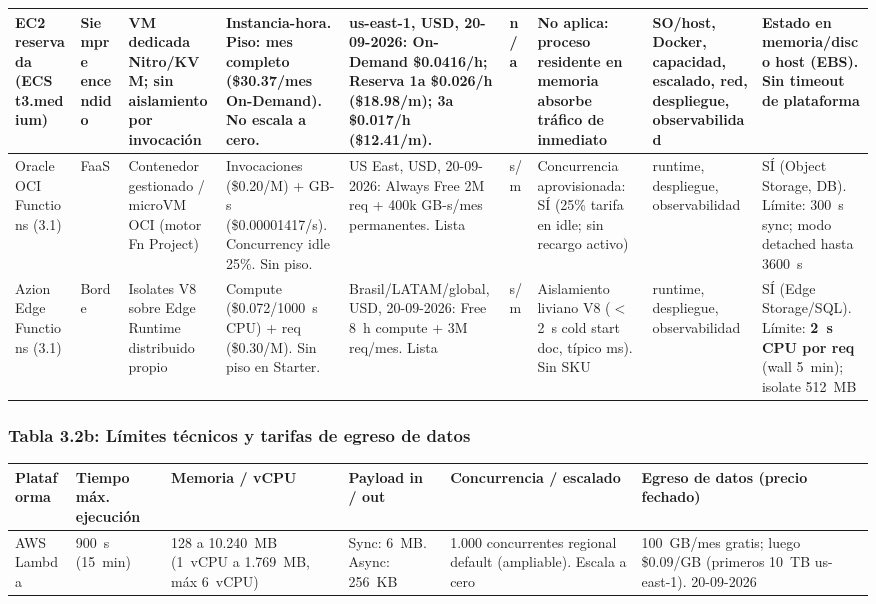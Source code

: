 \documentclass[12pt, letterpaper, table, xcdraw]{inf-pucv}
\begin{document}
\begin{landscape}
{\begin{longtable}{|p{2.1cm}|p{1.6cm}|p{2.4cm}|p{2.8cm}|p{3.1cm}|p{1.0cm}|p{2.1cm}|p{2.6cm}|p{2.8cm}|}
EC2 reservada (ECS t3.medium) & Siempre encendido & VM dedicada Nitro/KVM; sin aislamiento por invocación & Instancia-hora. \textbf{Piso: mes completo (\$30.37/mes On-Demand). No escala a cero.} & us-east-1, USD, 20-09-2026: On-Demand \$0.0416/h; Reserva 1a \$0.026/h (\$18.98/m); 3a \$0.017/h (\$12.41/m). & n/a & No aplica: proceso residente en memoria absorbe tráfico de inmediato & SO/host, Docker, capacidad, escalado, red, despliegue, observabilidad & Estado en memoria/disco host (EBS). Sin timeout de plataforma \\ \hline

Oracle OCI Functions (3.1) & FaaS & Contenedor gestionado / microVM OCI (motor Fn Project) & Invocaciones (\$0.20/M) + GB-s (\$0.00001417/s). Concurrency idle 25\%. Sin piso. & US East, USD, 20-09-2026: Always Free 2M req + 400k GB-s/mes permanentes. Lista & s/m & Concurrencia aprovisionada: SÍ (25\% tarifa en idle; sin recargo activo) & runtime, despliegue, observabilidad & SÍ (Object Storage, DB). Límite: 300~s sync; modo detached hasta 3600~s \\ \hline

Azion Edge Functions (3.1) & Borde & Isolates V8 sobre Edge Runtime distribuido propio & Compute (\$0.072/1000~s CPU) + req (\$0.30/M). Sin piso en Starter. & Brasil/LATAM/global, USD, 20-09-2026: Free 8~h compute + 3M req/mes. Lista & s/m & Aislamiento liviano V8 ($<$2~s cold start doc, típico ms). Sin SKU & runtime, despliegue, observabilidad & SÍ (Edge Storage/SQL). Límite: \textbf{2~s CPU por req} (wall 5~min); isolate 512~MB \\ \hline
\end{longtable}
}



\subsubsection*{Tabla 3.2b: Límites técnicos y tarifas de egreso de datos}
{\makeatletter\def\@currentlabel{3.2b}\makeatother\label{tab:cuadro-3-2b}}

{\scriptsize
\setlength{\tabcolsep}{3pt}
\begin{longtable}{|p{2.6cm}|p{3.2cm}|p{3.4cm}|p{3.2cm}|p{3.6cm}|p{4.2cm}|}
\hline
\textbf{Plataforma} & \textbf{Tiempo máx. ejecución} & \textbf{Memoria / vCPU} & \textbf{Payload in / out} & \textbf{Concurrencia / escalado} & \textbf{Egreso de datos (precio fechado)} \\ \hline
\endhead

AWS Lambda & 900~s (15~min) & 128 a 10.240~MB (1~vCPU a 1.769~MB, máx 6~vCPU) & Sync: 6~MB. Async: 256~KB & 1.000 concurrentes regional default (ampliable). Escala a cero & 100~GB/mes gratis; luego \$0.09/GB (primeros 10~TB us-east-1). 20-09-2026 \\ \hline


\end{longtable}}
\end{landscape}
\end{document}

